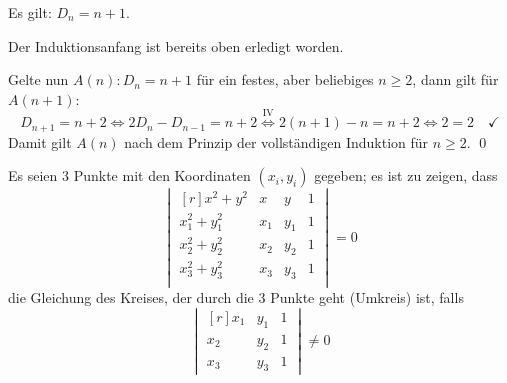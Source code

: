 \documentclass[answers]{exam}
\newcommand{\dvektor}[1]{\begin{vmatrix*}[r] #1 \end{vmatrix*}}
\begin{document}
\begin{questions}
\begin{parts}
\begin{solution}
            Es gilt: $D_n = n+1$.

            Der Induktionsanfang ist bereits oben erledigt worden.

            Gelte nun $A(n) : D_n = n+1$ für ein festes, aber beliebiges $n \geq 2$, dann gilt für $A(n+1)$:
            $$
                D_{n+1} = n + 2 \iff 2 D_n - D_{n-1} = n+2 \overset{\text{IV}}{\iff} 2(n+1) - n = n + 2 \iff 2 = 2 \quad \checkmark
            $$
            Damit gilt $A(n)$ nach dem Prinzip der vollständigen Induktion für $n \geq 2$. \qed
        \end{solution}
    \end{parts}

    \newpage
    \question
    Es seien 3 Punkte mit den Koordinaten $(x_i, y_i)$ gegeben; es ist zu zeigen, dass
    $$
        \dvektor{
            x^2 + y^2 & x & y & 1 \\
            x_1^2 + y_1^2 & x_1 & y_1 & 1 \\
            x_2^2 + y_2^2 & x_2 & y_2 & 1 \\
            x_3^2 + y_3^2 & x_3 & y_3 & 1 \\
        }
        = 0
    $$
    die Gleichung des Kreises, der durch die 3 Punkte geht (Umkreis) ist, falls
    $$
        \dvektor{
            x_1 & y_1 & 1 \\
            x_2 & y_2 & 1 \\
            x_3 & y_3 & 1
        }
        \neq 0
    $$


\end{questions}
\end{document}
